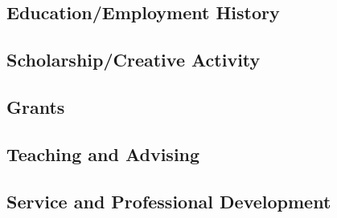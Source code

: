 
\subsection*{Education/Employment History}


\subsection*{Scholarship/Creative Activity}


\subsection*{Grants}


\subsection*{Teaching and Advising}


\subsection*{Service and Professional Development}

